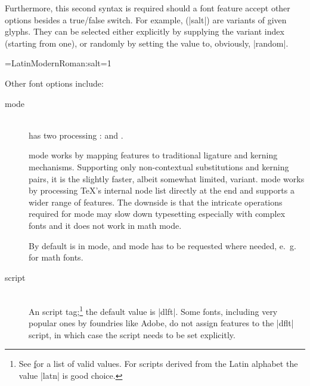 \noindent
Furthermore, this second syntax is required should a font feature
accept other options besides a true/false switch.
%
For example,  (|salt|) are variants of
given glyphs.
%
They can be selected either explicitly by supplying the variant
index (starting from one), or randomly by setting the value to,
obviously, |random|.

\beginlisting
  \font\librmsaltfirst=LatinModernRoman:salt=1
\endlisting

\noindent Other font options include:

\begin{description}

\item [mode] \hfill \\
        has two \OpenType processing
       :
        and .

        mode works by mapping \OpenType
       features to traditional \TEX ligature and kerning mechanisms.
       Supporting only non-contextual substitutions and kerning
       pairs, it is the slightly faster, albeit somewhat limited, variant.
        mode works by processing \TeX’s internal
       node list directly at the \LUA end and supports
       a wider range of \OpenType features.
       The downside is that the intricate operations required for
        mode may slow down typesetting especially
       with complex fonts and it does not work in math mode.

       By default  is in 
       mode, and  mode has to be requested where needed,
       e.~g. for math fonts.

\item [script] \label{script-tag} \hfill \\
       An \OpenType script tag;\footnote{%
         See \hyperlink {http://www.microsoft.com/typography/otspec/scripttags.htm}
         for a list of valid values.
         For scripts derived from the Latin alphabet the value
         |latn| is good choice.
       }
       the default value is |dlft|.
       Some fonts, including very popular ones by foundries like Adobe,
       do not assign features to the |dflt| script, in
       which case the script needs to be set explicitly.


\end{description}
